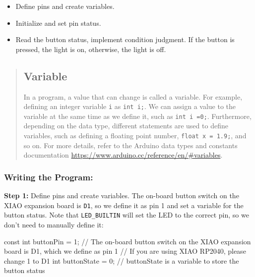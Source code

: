 \documentclass[
  letterpaper,
  DIV=11,
  numbers=noendperiod]{scrreprt}
\newenvironment{Shaded}{\begin{snugshade}}{\end{snugshade}}
\newcommand{\AttributeTok}[1]{\textcolor[rgb]{0.40,0.45,0.13}{#1}}
\newcommand{\CommentTok}[1]{\textcolor[rgb]{0.37,0.37,0.37}{#1}}
\newcommand{\DataTypeTok}[1]{\textcolor[rgb]{0.68,0.00,0.00}{#1}}
\newcommand{\DecValTok}[1]{\textcolor[rgb]{0.68,0.00,0.00}{#1}}
\newcommand{\NormalTok}[1]{\textcolor[rgb]{0.00,0.23,0.31}{#1}}
\newcommand{\OperatorTok}[1]{\textcolor[rgb]{0.37,0.37,0.37}{#1}}
\providecommand{\tightlist}{%
  \setlength{\itemsep}{0pt}\setlength{\parskip}{0pt}}\usepackage{longtable,booktabs,array}
\begin{document}
\begin{itemize}
\tightlist
\item
  Define pins and create variables.
\item
  Initialize and set pin status.
\item
  Read the button status, implement condition judgment. If the button is
  pressed, the light is on, otherwise, the light is off.
\end{itemize}

\begin{quote}
\hypertarget{variable}{%
\subsection*{Variable}\label{variable}}

In a program, a value that can change is called a variable. For example,
defining an integer variable \texttt{i} as \texttt{int\ i;}. We can
assign a value to the variable at the same time as we define it, such as
\texttt{int\ i\ =0;}. Furthermore, depending on the data type, different
statements are used to define variables, such as defining a floating
point number, \texttt{float\ x\ =\ 1.9;}, and so on. For more details,
refer to the Arduino data types and constants documentation
\url{https://www.arduino.cc/reference/en/\#variables}.
\end{quote}

\hypertarget{writing-the-program}{%
\subsubsection*{Writing the Program:}\label{writing-the-program}}

\textbf{Step 1:} Define pins and create variables. The on-board button
switch on the XIAO expansion board is \texttt{D1}, so we define it as
pin 1 and set a variable for the button status. Note that
\texttt{LED\_BUILTIN} will set the LED to the correct pin, so we don't
need to manually define it:

\begin{Shaded}
\begin{Highlighting}[]
\AttributeTok{const} \DataTypeTok{int}\NormalTok{ buttonPin }\OperatorTok{=} \DecValTok{1}\OperatorTok{;}  \CommentTok{// The on{-}board button switch on the XIAO expansion board is D1, which we define as pin 1}
\CommentTok{// If you are using XIAO RP2040, please change 1 to D1}
\DataTypeTok{int}\NormalTok{ buttonState }\OperatorTok{=} \DecValTok{0}\OperatorTok{;}  \CommentTok{// buttonState is a variable to store the button status}
\end{Highlighting}
\end{Shaded}
\end{document}

